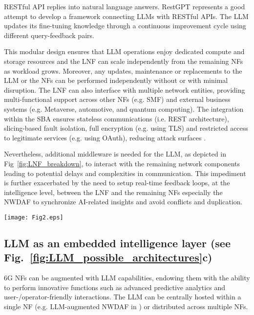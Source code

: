 \gls{RESTful} API replies into natural language answers. RestGPT \cite{song2023restgpt} represents a good attempt to develop a framework connecting \glspl{LLM} with \gls{RESTful} APIs. The \gls{LLM} updates its fine-tuning knowledge through a continuous improvement cycle using different query-feedback pairs.

This modular design ensures that \gls{LLM} operations enjoy dedicated compute and storage resources and the \gls{LNF} can scale independently from the remaining \glspl{NF} as workload grows. Moreover, any updates, maintenance or replacements to the \gls{LLM} or the \glspl{NF} can be performed independently without or with minimal disruption. The \gls{LNF} can also interface with multiple network entities, providing multi-functional support across other \glspl{NF} (e.g. \gls{SMF}) and external business systems (e.g. Metaverse, automotive, and quantum computing). The integration within the \gls{SBA} ensures stateless communications (i.e. REST architecture), slicing-based fault isolation, full encryption (e.g. using TLS) and restricted access to legitimate services (e.g. using OAuth), reducing attack surfaces \cite{Khaloopour2024Resilience}.

Nevertheless, additional middleware is needed for the \gls{LLM}, as depicted in Fig~\ref{fig:LNF_breakdown}, to interact with the remaining network components leading to potential delays and complexities in communication. This impediment is further exacerbated by the need to setup real-time feedback loops, at the intelligence level, between the \gls{LNF} and the remaining \glspl{NF} especially the \gls{NWDAF} to synchronize \gls{AI}-related insights and avoid conflicts and duplication.
\begin{figure*}[t!]
\centering
\texttt{[image: Fig2.eps]}
    \caption{A breakdown of the \gls{LNF}.}
    \label{fig:LNF_breakdown}
\end{figure*}

\subsection{LLM as an embedded intelligence layer (see Fig.~\ref{fig:LLM_possible_architectures}c)}
\label{subsec:integrated_llm}
6G \glspl{NF} can be augmented with \gls{LLM} capabilities, endowing them with the ability to perform innovative functions such as advanced predictive analytics and user-/operator-friendly interactions. The \gls{LLM} can be centrally hosted within a single \gls{NF} (e.g. \gls{LLM}-augmented \gls{NWDAF} in \cite{Kan2024mobile_llama}) or distributed across multiple \glspl{NF}.

